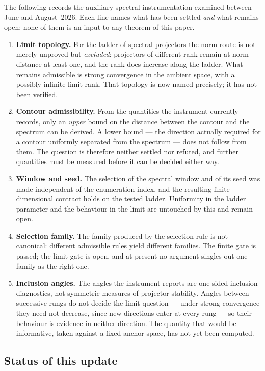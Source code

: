 \documentclass[12pt,a4paper]{article}
\theoremstyle{definition}
\theoremstyle{remark}
\begin{document}
The following records the auxiliary spectral instrumentation examined
between June and August~2026.  Each line names what has been settled
\emph{and} what remains open; none of them is an input to any theorem
of this paper.
\begin{enumerate}[label=(I\arabic*)]
\item \textbf{Limit topology.}  For the ladder of spectral projectors the
  norm route is not merely unproved but \emph{excluded}: projectors of
  different rank remain at norm distance at least one, and the rank does
  increase along the ladder.  What remains admissible is strong
  convergence in the ambient space, with a possibly infinite limit rank.
  That topology is now named precisely; it has not been verified.
\item \textbf{Contour admissibility.}  From the quantities the instrument
  currently records, only an \emph{upper} bound on the distance between
  the contour and the spectrum can be derived.  A lower bound --- the
  direction actually required for a contour uniformly separated from the
  spectrum --- does not follow from them.  The question is therefore
  neither settled nor refuted, and further quantities must be measured
  before it can be decided either way.
\item \textbf{Window and seed.}  The selection of the spectral window and
  of its seed was made independent of the enumeration index, and the
  resulting finite-dimensional contract holds on the tested ladder.
  Uniformity in the ladder parameter and the behaviour in the limit are
  untouched by this and remain open.
\item \textbf{Selection family.}  The family produced by the selection
  rule is not canonical: different admissible rules yield different
  families.  The finite gate is passed; the limit gate is open, and at
  present no argument singles out one family as the right one.
\item \textbf{Inclusion angles.}  The angles the instrument reports are
  one-sided inclusion diagnostics, not symmetric measures of projector
  stability.  Angles between successive rungs do not decide the limit
  question --- under strong convergence they need not decrease, since
  new directions enter at every rung --- so their behaviour is evidence
  in neither direction.  The quantity that would be informative, taken
  against a fixed anchor space, has not yet been computed.
\end{enumerate}

\subsection{Status of this update}
\end{document}
